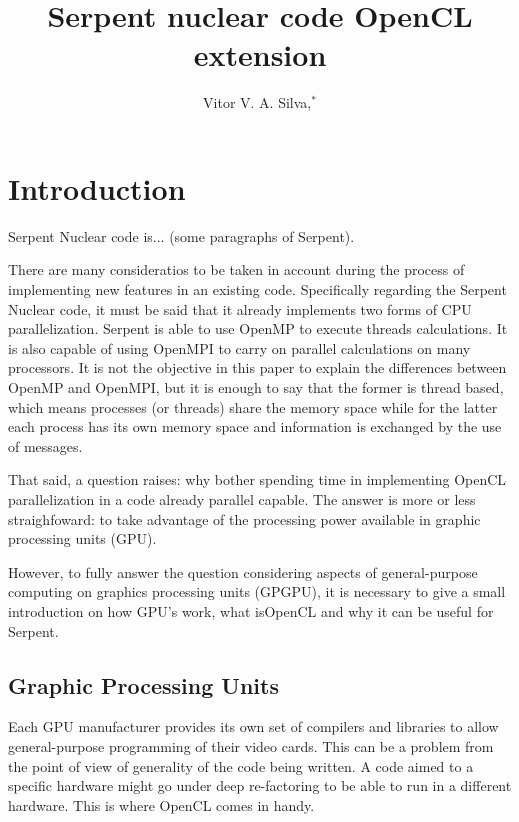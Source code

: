 \documentclass[twoside,a4paper,12pt,english,draft]{anstrans}
\title{Serpent nuclear code OpenCL extension}
\author{Vitor V. A. Silva,$^{*}$}
\institute{
$^{*}$Centro de Desenvolvimento da Tecnologia Nuclear, CEP: 30......
Belo Horizonte - MG, Brazil
}
\begin{document}
\vspace*{-42pt}
\begin{strip}
\vspace*{14pt}
\end{strip}


\section{Introduction}

Serpent Nuclear code is... (some paragraphs of Serpent).

There are many consideratios to be taken in account during the process of implementing new
features in an existing code. Specifically regarding the Serpent Nuclear code, it must be
said that it already implements two forms of CPU parallelization. Serpent is able to use
OpenMP\cite{omp} to execute threads calculations. It is also capable of using OpenMPI\cite{openmpi}
to carry on parallel calculations on many processors. It is not the objective in this paper
to explain the differences between OpenMP and OpenMPI, but it is enough to say that the former
is thread based, which means processes (or threads) share the memory space while for the latter
each process has its own memory space and information is exchanged by the use of messages.

That said, a question raises: why bother spending time in implementing OpenCL parallelization
in a code already parallel capable. The answer is more or less straighfoward: to take
advantage of the processing power available in graphic processing units (GPU).

However, to fully answer the question considering aspects of general-purpose computing on graphics
processing units (GPGPU), it is necessary to give a small introduction on how GPU's work, what isOpenCL and why
it can be useful for Serpent.

\subsection{Graphic Processing Units}

Each GPU manufacturer provides its own set of compilers and libraries to allow general-purpose
programming of their video cards. This can be a problem from the point of view of generality of
the code being written. A code aimed to a specific hardware might go under deep re-factoring to
be able to run in a different hardware. This is where OpenCL comes in handy.
\end{document}
